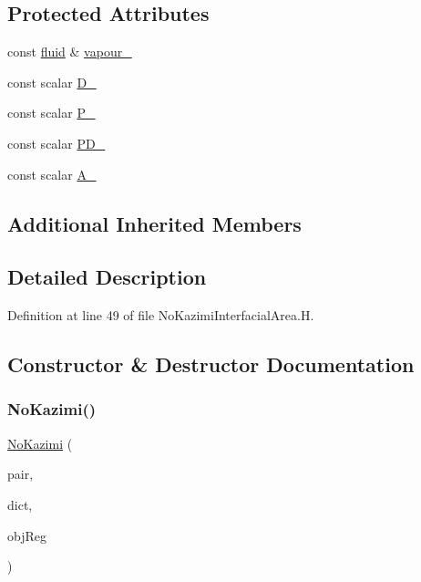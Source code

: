 \subsection*{Protected Attributes}
\begin{DoxyCompactItemize}
\item 
const \hyperlink{classFoam_1_1fluid}{fluid} \& \hyperlink{classFoam_1_1interfacialAreaModels_1_1NoKazimi_a2675e35060f71c22823e4a0b3c816dad}{vapour\+\_\+}
\item 
const scalar \hyperlink{classFoam_1_1interfacialAreaModels_1_1NoKazimi_ac5178eaceca14c37903e56d8a8bff07c}{D\+\_\+}
\item 
const scalar \hyperlink{classFoam_1_1interfacialAreaModels_1_1NoKazimi_a10357e8c1e678a03659e6c29f2c6df11}{P\+\_\+}
\item 
const scalar \hyperlink{classFoam_1_1interfacialAreaModels_1_1NoKazimi_a5729850f00382b69f3383767af2113dc}{P\+D\+\_\+}
\item 
const scalar \hyperlink{classFoam_1_1interfacialAreaModels_1_1NoKazimi_a964d35f7a0122b4371643835f79989e6}{A\+\_\+}
\end{DoxyCompactItemize}
\subsection*{Additional Inherited Members}


\subsection{Detailed Description}


Definition at line 49 of file No\+Kazimi\+Interfacial\+Area.\+H.



\subsection{Constructor \& Destructor Documentation}
\mbox{\label{classFoam_1_1interfacialAreaModels_1_1NoKazimi_ae108db9c96c6b2362c958ffd1eedc839}} 
\subsubsection{\texorpdfstring{No\+Kazimi()}{NoKazimi()}}
{\footnotesize\ttfamily \hyperlink{classFoam_1_1interfacialAreaModels_1_1NoKazimi}{No\+Kazimi} (\begin{DoxyParamCaption}\item[{const \hyperlink{classFoam_1_1FFPair}{F\+F\+Pair} \&}]{pair,  }\item[{const dictionary \&}]{dict,  }\item[{const object\+Registry \&}]{obj\+Reg }\end{DoxyParamCaption})}



